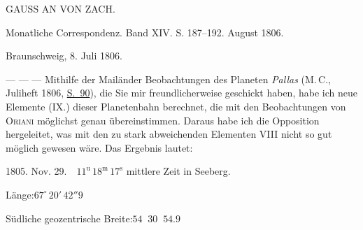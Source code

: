 \begin{center}
GAUSS AN VON ZACH.
\end{center}

\begin{center}
Monatliche Correspondenz. Band XIV. S. 187–192. August 1806.
\end{center}

\begin{flushright}
Braunschweig, 8. Juli 1806.
\end{flushright}

\par\indent --- --- --- Mithilfe der Mailänder Beobachtungen des Planeten \emph{Pallas} (M.\,C., Juliheft 1806, \href{https://www.digitale-sammlungen.de/en/view/bsb10538606?page=100}{S.~90}), die Sie mir freundlicherweise geschickt haben, habe ich neue Elemente (IX.) dieser Planetenbahn berechnet, die mit den Beobachtungen von \textsc{Oriani} möglichst genau übereinstimmen. Daraus habe ich die Opposition hergeleitet, was mit den zu stark abweichenden Elementen VIII nicht so gut möglich gewesen wäre. Das Ergebnis lautet:

\begin{center}
1805. Nov. 29.\ \ $11^{\mathrm{u}}\,18^{\mathrm{m}}\,17^{\mathrm{s}}$ mittlere Zeit in Seeberg.

Länge:\quad $67^\circ\,20'\,42''9$

Südliche geozentrische Breite:\quad $54\;\;30\;\;54.9$
\end{center}

